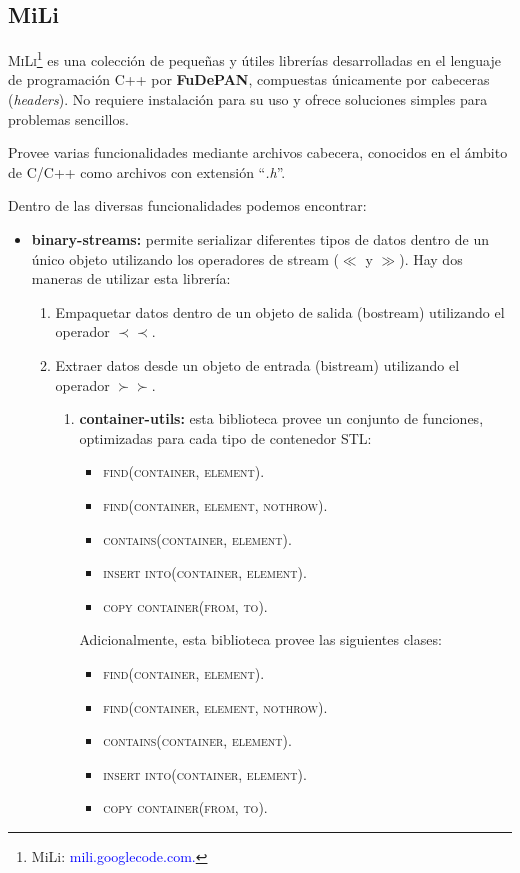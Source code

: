 \documentclass[12pt,a4paper,spanish]{article}
\begin{document}
	\subsection{MiLi}
		\par \textsc{MiLi}\footnote{MiLi: \textcolor{blue}{mili.googlecode.com.}} es una colección de pequeñas y útiles librerías desarrolladas en el 			lenguaje de programación \textsc{C++} por \textbf{FuDePAN}, compuestas únicamente por cabeceras (\textit{headers}). No requiere instalación para 			su uso y ofrece soluciones simples para problemas sencillos.
		\par Provee varias funcionalidades mediante archivos cabecera, conocidos en el ámbito de C/C++ como archivos con extensión ``\textit{.h}''. 
		\par Dentro de las diversas funcionalidades podemos encontrar:
		\begin{itemize}
			\item \textbf{binary-streams:} permite serializar diferentes tipos de datos dentro de un único objeto utilizando los operadores de stream 											  ($\ll$ y $\gg$). Hay dos maneras de utilizar esta librería:
											\begin{enumerate}
												\item Empaquetar datos dentro de un objeto de salida (bostream) utilizando el operador $\prec \prec$.	
												\item Extraer datos desde un objeto de entrada (bistream) utilizando el operador $\succ \succ$.
											\begin{enumerate}
			\item \textbf{container-utils:} esta biblioteca provee un conjunto de funciones, optimizadas para cada tipo de contenedor STL:
						\begin{itemize}
							\item \textsc{find(container, element)}.
							\item \textsc{find(container, element, nothrow)}.
							\item \textsc{contains(container, element)}.
							\item \textsc{insert into(container, element)}.
							\item \textsc{copy container(from, to)}.
						\end{itemize}
						\par Adicionalmente, esta biblioteca provee las siguientes clases:
						\begin{itemize}
							\item \textsc{find(container, element)}.
							\item \textsc{find(container, element, nothrow)}.
							\item \textsc{contains(container, element)}.
							\item \textsc{insert into(container, element)}.
							\item \textsc{copy container(from, to)}.
						\end{itemize}
	


\end{enumerate}
\end{enumerate}
\end{itemize}
\end{document}
